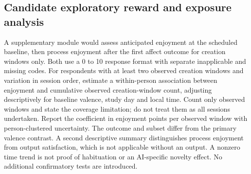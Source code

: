 \documentclass[11pt]{article}
\begin{document}
\subsection{Candidate exploratory reward and exposure analysis}
A supplementary module would assess anticipated enjoyment at the scheduled baseline, then process enjoyment after the first affect outcome for creation windows only. Both use a 0 to 10 response format with separate inapplicable and missing codes. For respondents with at least two observed creation windows and variation in session order, estimate a within-person association between enjoyment and cumulative observed creation-window count, adjusting descriptively for baseline valence, study day and local time. Count only observed windows and state the coverage limitation; do not treat them as all sessions undertaken. Report the coefficient in enjoyment points per observed window with person-clustered uncertainty. The outcome and subset differ from the primary valence contrast. A second descriptive summary distinguishes process enjoyment from output satisfaction, which is not applicable without an output. A nonzero time trend is not proof of habituation or an AI-specific novelty effect. No additional confirmatory tests are introduced.
\end{document}
